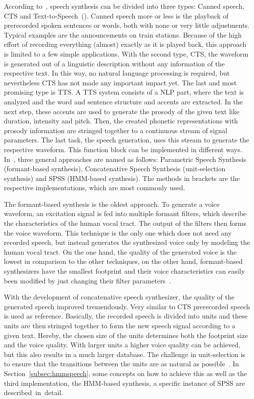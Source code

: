 According to~\cite{hinterleitner:quality}, speech synthesis can be divided into three types: Canned speech, \ac{CTS} and Text-to-\break Speech~(). Canned speech more or less is the playback of prerecorded spoken sentences or words, both with none or very little adjustments. Typical examples are the announcements on train stations. Because of the high effort of recording everything (almost) exactly as it is played back, this approach is limited to a few simple applications. With the second type, \ac{CTS}, the waveform is generated out of a linguistic description without any information of the respective text. In this way, no natural language processing is required, but nevertheless \ac{CTS} has not made any important impact yet. The last and most promising type is \ac{TTS}. A \ac{TTS} system consists of a \ac{NLP} part, where the text is analyzed and the word and sentence structure and accents are extracted. In the next step, these accents are used to generate the prosody of the given text like duration, intensity and pitch. Then, the created phonetic representations with prosody information are stringed together to a continuous stream of signal parameters. The last task, the speech generation, uses this stream to generate the respective waveform. This function block can be implemented in different ways. In~\cite{hinterleitner:quality}, three general approaches are named as follows: Parametric Speech Synthesis (formant-based synthesis), Concatenative Speech Synthesis (unit-selection synthesis) and \acf{SPSS} (\acf{HMM}-based synthesis). The methods in brackets are the respective implementations, which are most commonly used. 

The formant-based synthesis is the oldest approach. To generate a voice waveform, an excitation signal is fed into multiple formant filters, which describe the characteristics of the human vocal tract. The output of the filters then forms the voice waveform. This technique is the only one which does not need any recorded speech, but instead generates the synthesized voice only by modeling the human vocal tract. On the one hand, the quality of the generated voice is the lowest in comparison to the other techniques, on the other hand, formant-based synthesizers have the smallest footprint and their voice characteristics can easily been modified by just changing their filter parameters~\cite{hinterleitner:quality}.

With the development of concatenative speech synthesizer, the quality of the generated speech improved tremendously. Very similar to \ac{CTS} prerecorded speech is used as reference. Basically, the recorded speech is divided into units and these units are then stringed together to form the new speech signal according to a given text. Hereby, the chosen size of the units determines both the footprint size and the voice quality. With larger units a higher voice quality can be achieved, but this also results in a much larger database. The challenge in unit-selection is to ensure that the transitions between the units are as natural as possible~\cite{hinterleitner:quality}. In Section~\ref{subsec:hmmspeech}, some concepts on how to achieve this as well as the third implementation, the \ac{HMM}-based synthesis, a specific instance of \ac{SPSS} are described~in~detail.

